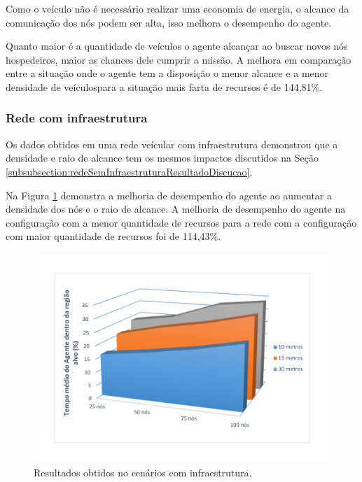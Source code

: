 Como o veículo não é necessário realizar uma economia de energia, o alcance da comunicação dos nós podem ser alta, isso melhora o desempenho do agente. 

Quanto maior é a quantidade de veículos o agente alcançar ao buscar novos nós hospedeiros, maior as chances dele cumprir a missão. A melhora em comparação entre a situação onde o agente tem a disposição o menor alcance e a menor densidade de veículospara a situação mais farta de recursos é de 144,81\%.   





\subsubsection{Rede com infraestrutura}

	Os dados obtidos em uma rede veícular com infraestrutura demonstrou que a densidade e raio de alcance tem os mesmos impactos discutidos na Seção 
	\ref{subsubsection:redeSemInfraestruturaResultadoDiscucao}.

	Na Figura \ref{fig:graficosComTorres} demonstra a melhoria de desempenho do agente ao aumentar a densidade dos nós e o raio de alcance. A melhoria de desempenho do agente na configuração com a menor quantidade de recursos para a rede com a configuração com maior quantidade de recursos foi de 114,43\%.   
 

	\begin{figure}[htbp]
		\centering
		\includegraphics[scale=0.34]{resultados/graficos/graficoComTorres.pdf}
		\caption{Resultados obtidos no cenários com infraestrutura.}
		\label{fig:graficosComTorres}
	\end{figure}

